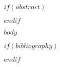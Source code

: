 \documentclass[$if(documentclassoptions)$$documentclassoptions$$else$11pt,a4paper,cite$endif$]{article}
\title{$for(title)$$title$$sep$ \and $endfor$}
\author{$for(author)$$author$$sep$ \and $endfor$}
\date{$date$}
\begin{document}
\maketitle

$if(abstract)$
\begin{abstract}
$abstract$
\end{abstract}
$endif$

$body$

$if(bibliography)$

$endif$
\end{document}
